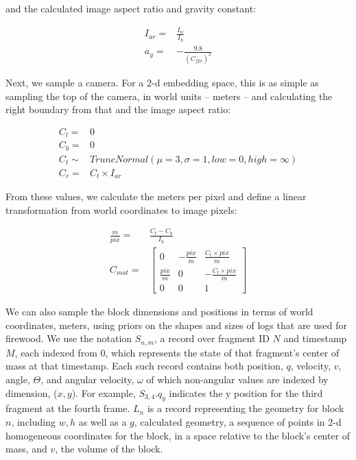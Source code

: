 \documentclass[10pt,twocolumn,letterpaper]{article}
\begin{document}
and the calculated image aspect ratio and gravity constant:

\begin{align*}
    I_{ar} =&  \frac{I_w}{I_h} \\
       a_y =& -\frac{9.8}{(C_{fps})^2}
\end{align*}

Next, we sample a camera. For a 2-d embedding space, this is as simple as 
sampling the top of the camera, in world units -- meters -- and calculating the 
right boundary from that and the image aspect ratio:

\begin{align*}
     C_l =& 0 \\
     C_b =& 0 \\
    C_t \sim& TruncNormal(\mu=3,\sigma=1,low=0,high=\infty) \\
     C_r =& C_t \times I_{ar}
\end{align*}

From these values, we calculate the meters per pixel and define a linear 
transformation from world coordinates to image pixels:

\begin{align*}
    \frac{m}{pix} =& \frac{C_t - C_b}{I_h} \\
          C_{mat} =& \begin{bmatrix}
                        0 & -\frac{pix}{m} &  \frac{C_t \times pix}{m} \\
            \frac{pix}{m} &              0 & -\frac{C_l \times pix}{m} \\
                        0 &              0 &                         1
        \end{bmatrix}
\end{align*}

We can also sample the block dimensions and positions in terms of world 
coordinates, meters, using priors on the shapes and sizes of logs that are used 
for firewood. We use the notation 
$S_{n,m}$, a record over fragment ID $N$ 
and timestamp $M$, each indexed from 0, which represents the state of that 
fragment's center of mass at that timestamp. Each such record contains both position, 
$q$, velocity, $v$, angle, $\Theta$, and angular velocity, $\omega$ of which 
non-angular values are indexed by dimension, ($x, y$). For 
example, $S_{3,4}.q_y$ indicates the y position for 
the third fragment at the fourth frame. $L_n$ is a record representing the geometry for 
block $n$, including $w, h$ as well as a $g$, calculated geometry, a 
sequence of points in 2-d homogeneous coordinates for the block, in a space 
relative to the block's center of mass, and $v$, the volume of the block.
\end{document}
